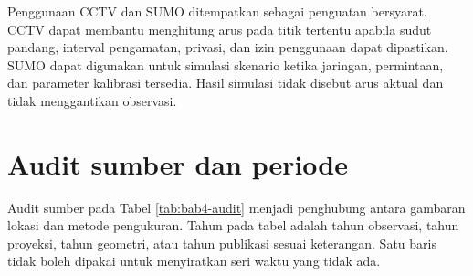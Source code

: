 \documentclass[11pt,a4paper,oneside,openany,indonesian]{report}
\begin{document}
Penggunaan CCTV dan SUMO ditempatkan sebagai penguatan bersyarat. CCTV dapat membantu menghitung arus pada titik tertentu apabila sudut pandang, interval pengamatan, privasi, dan izin penggunaan dapat dipastikan. SUMO dapat digunakan untuk simulasi skenario ketika jaringan, permintaan, dan parameter kalibrasi tersedia. Hasil simulasi tidak disebut arus aktual dan tidak menggantikan observasi.

\section{Audit sumber dan periode}

Audit sumber pada Tabel \ref{tab:bab4-audit} menjadi penghubung antara gambaran lokasi dan metode pengukuran. Tahun pada tabel adalah tahun observasi, tahun proyeksi, tahun geometri, atau tahun publikasi sesuai keterangan. Satu baris tidak boleh dipakai untuk menyiratkan seri waktu yang tidak ada.
\end{document}
